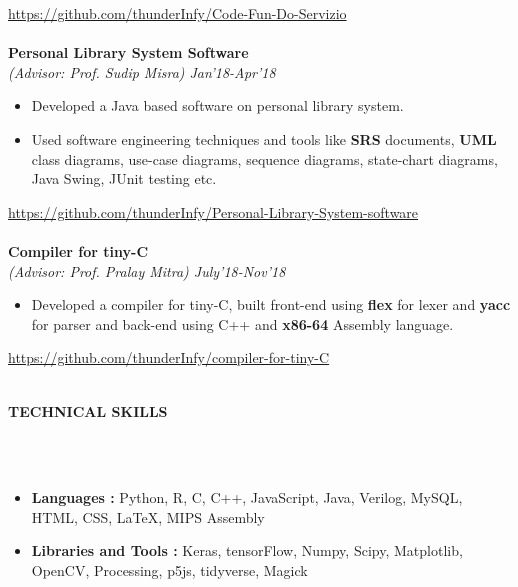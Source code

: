 \documentclass[letter,10pt]{book}
\newcommand{\lsep}{-0.5cm}
\newcommand{\resheading}[1]{{\small \colorbox{mygrey}{\begin{minipage}{0.975\textwidth}{\textbf{#1 \vphantom{p\^{E}}}}\end{minipage}}}}
\begin{document}
\href{https://github.com/thunderInfy/Code-Fun-Do-Servizio}{https://github.com/thunderInfy/Code-Fun-Do-Servizio}
\\\\
\large \textbf{Personal Library System Software} \normalsize\\
\emph{(Advisor: Prof. Sudip Misra) \hfill Jan'18-Apr'18} \\[-2em]
\begin{itemize}
\item Developed a Java based software on personal library system. \\[-2em]
\item Used software engineering techniques and tools like \textbf{SRS} documents, \textbf{UML} class diagrams, use-case diagrams, sequence diagrams, state-chart diagrams, Java Swing, JUnit testing etc.\\[-1.8em]
\end{itemize}
\href{https://github.com/thunderInfy/Personal-Library-System-software}{https://github.com/thunderInfy/Personal-Library-System-software}
\\\\
\large \textbf{Compiler for tiny-C} \normalsize\\
\emph{(Advisor: Prof. Pralay Mitra) \hfill July'18-Nov'18} \\[-2em]
\begin{itemize} 
\item Developed a compiler for tiny-C, built front-end using  \textbf{flex} for lexer and  \textbf{yacc} for parser and back-end using C++ and \textbf{x86-64} Assembly language.\\[-1.8em]
\end{itemize}
\href{https://github.com/thunderInfy/compiler-for-tiny-C}{https://github.com/thunderInfy/compiler-for-tiny-C}
\\

\hspace{0.5cm}\\[-0.2cm]
\resheading{\textbf{TECHNICAL SKILLS} }\\[\lsep]
\\[-1em]
\begin{itemize}
\item \textbf{Languages :} Python, R, C, C++, JavaScript, Java, Verilog, MySQL, HTML, CSS, {\LaTeX{}}, MIPS Assembly
\\[-2em]
\item \textbf{Libraries and Tools :} Keras, tensorFlow, Numpy, Scipy, Matplotlib, OpenCV, Processing, p5js, tidyverse, Magick
\end{itemize}
\end{document}
